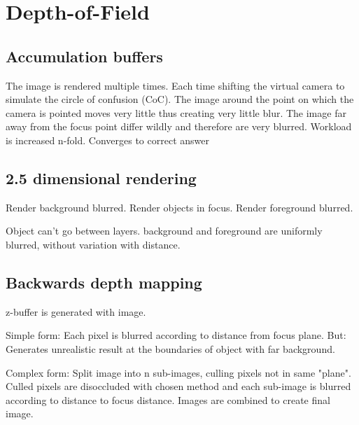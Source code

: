 \chapter{Depth-of-Field}

\section{Accumulation buffers}
The image is rendered multiple times.
Each time shifting the virtual camera to simulate the circle of confusion (CoC).
The image around the point on which the camera is pointed moves very little thus creating very little blur.
The image far away from the focus point differ wildly and therefore are very blurred.
Workload is increased n-fold. Converges to correct answer

\section{2.5 dimensional rendering}
Render background blurred.
Render objects in focus.
Render foreground blurred.

Object can't go between layers.
background and foreground are uniformly blurred, without variation with distance.

\section{Backwards depth mapping}
z-buffer is generated with image.

Simple form: Each pixel is blurred according to distance from focus plane.
But: Generates unrealistic result at the boundaries of object with far background.

Complex form: Split image into n sub-images, culling pixels not in same "plane".
Culled pixels are disoccluded with chosen method and each sub-image is blurred according to distance to focus distance.
Images are combined to create final image.

